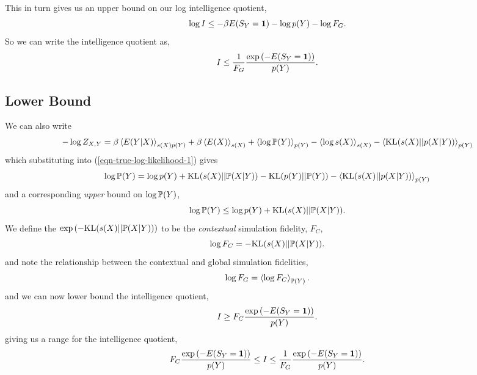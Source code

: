 \documentclass[]{article}
\begin{document}
This in turn gives us an upper bound on our log intelligence quotient,
\[
\log I \leq -\beta E(S_Y = \textbf{1}) -\log p(Y) - \log F_G.
\]
So we can write the intelligence quotient as,
\[
I \leq \frac{1}{F_G}\frac{\exp\left(-E(S_Y=\textbf{1})\right)}{p(Y)}.
\]

\subsection{Lower Bound}

We can also write 
\[
-  \log Z_{X,Y} = \beta\left\langle E(Y | X) \right\rangle_{s(X)p(Y)} + \beta\left\langle E(X) \right\rangle_{s(X )} + \left\langle \log \mathbb{P}(Y) \right\rangle_{p(Y)} -\left\langle \log s(X) \right\rangle_{s(X)} - \left\langle \text{KL}(s(X) || p(X | Y)) \right\rangle_{p(Y)}
\]
which substituting into (\ref{eqn-true-log-likelihood-1}) gives
\[
\log \mathbb{P}(Y) = \log p(Y) +  \text{KL}(s(X)||\mathbb{P}(X|Y)) - \text{KL}(p(Y) || \mathbb{P}(Y)) - \left\langle \text{KL}(s(X) || p(X | Y)) \right\rangle_{p(Y)}
\]
and a corresponding \emph{upper} bound on $\log \mathbb{P}(Y)$, 
\[
\log \mathbb{P}(Y) \leq \log p(Y) +   \text{KL}(s(X)||\mathbb{P}(X|Y)).
\]
We define the $\exp\left(- \text{KL}(s(X)||\mathbb{P}(X|Y))\right)$ to be the \emph{contextual} simulation fidelity, $F_C$,
\[
\log F_C = -\text{KL}(s(X)||\mathbb{P}(X|Y)).
\]
and note the relationship between the contextual and global simulation fidelities,
\[
\log F_G = \left\langle \log F_C \right\rangle_{\mathbb{P}(Y)}.
\]
and we can now lower bound the intelligence quotient,
\[
I \geq F_C \frac{\exp\left(-E(S_Y= \textbf{1})\right)}{p(Y)}.
\]
giving us a range for the intelligence quotient,
\[
F_C \frac{\exp\left(-E(S_Y= \textbf{1})\right)}{p(Y)} \leq I \leq \frac{1}{F_G}\frac{\exp\left(-E(S_Y= \textbf{1})\right)}{p(Y)}.
\]
\end{document}
